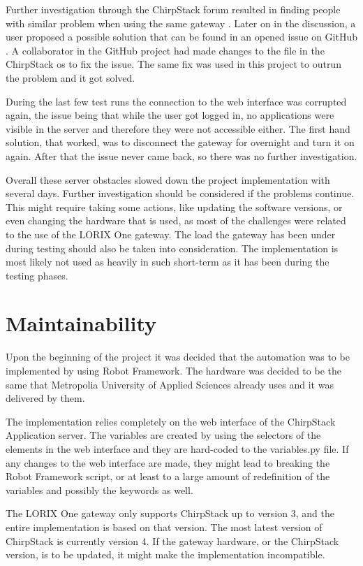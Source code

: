 Further investigation through the ChirpStack forum resulted in finding people with similar problem when using the same gateway \cite{chirpstack_forum:redis_error}.
Later on in the discussion, a user proposed a possible solution that can be found in an opened issue on GitHub \cite{github:redis_issue}.
A collaborator in the GitHub project had made changes to the  file in the ChirpStack \gls{os} to fix the issue.
The same fix was used in this project to outrun the problem and it got solved.

During the last few test runs the connection to the web interface was corrupted again, the issue being that while the user got logged in, no applications were visible in the server and therefore they were not accessible either.
The first hand solution, that worked, was to disconnect the gateway for overnight and turn it on again.
After that the issue never came back, so there was no further investigation.

Overall these server obstacles slowed down the project implementation with several days.
Further investigation should be considered if the problems continue.
This might require taking some actions, like updating the software versions, or even changing the hardware that is used, as most of the challenges were related to the use of the LORIX One gateway.
The load the gateway has been under during testing should also be taken into consideration.
The implementation is most likely not used as heavily in such short-term as it has been during the testing phases.


\section{Maintainability}
 Upon the beginning of the project it was decided that the automation was to be implemented by using Robot Framework.
 The hardware was decided to be the same that Metropolia University of Applied Sciences already uses and it was delivered by them.

The implementation relies completely on the web interface of the ChirpStack Application server.
The variables are created by using the selectors of the elements in the web interface and they are hard-coded to the variables.py file.
If any changes to the web interface are made, they might lead to breaking the Robot Framework script, or at least to a large amount of redefinition of the variables and possibly the keywords as well.

The LORIX One gateway only supports ChirpStack up to version 3, and the entire implementation is based on that version.
The most latest version of ChirpStack is currently version 4.
If the gateway hardware, or the ChirpStack version, is to be updated, it might make the implementation incompatible.

